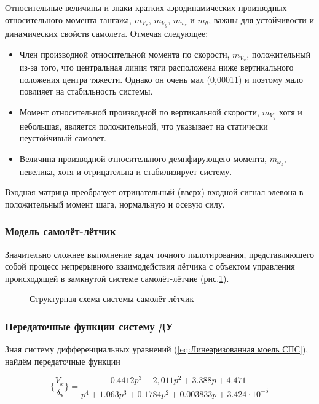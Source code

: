 Относительные величины и знаки кратких аэродинамических
производных относительного момента тангажа, $m_{V_x}$, $m_{V_y}$, $m_{\omega_z}$ и $m_\theta$, важны для устойчивости и динамических свойств
самолета. Отмечая следующее:
\begin{itemize}
\item Член производной относительной момента по скорости, $m_{V_x}$, положительный из-за того, что центральная линия тяги расположена
ниже вертикального положения центра тяжести. Однако он очень мал (0,00011) и поэтому мало повлияет на стабильность системы.
\item Момент относительной производной по вертикальной скорости, $m_{V_y}$ хотя и небольшая, является положительной, что указывает на статически
неустойчивый самолет.
\item Величина производной относительного демпфирующего момента, $m_{\omega_z}$, невелика, хотя и отрицательна и стабилизирует систему.
\end{itemize}

Входная матрица преобразует отрицательный (вверх) входной сигнал элевона в положительный момент шага, нормальную и осевую силу.

\subsubsection{Модель самолёт-лётчик}

Значительно сложнее выполнение задач точного пилотирования, представляющего собой процесс непрерывного взаимодействия лётчика
с объектом управления происходящей в замкнутой системе самолёт-лётчие (рис.{\ref{fig:Самолёт-лётчик}}).

\begin{figure}
    {\label{fig:Самолёт-лётчик}}
    \caption{Структурная схема системы самолёт-лётчик}   
\end{figure}



\subsubsection{Передаточные функции систему ДУ}

Зная систему дифференциальных уравнений ({\ref{eq:Линеаризованная моель СПС}}), найдём передаточные функции 

\begin{equation}
    \label{eq:ПФ по горизонтальной скорости СПС}
    \{ \frac{V_x}{\delta_\text{э}} \} = \frac{-0.4412p^3 - 2,011p^2 + 3.388p + 4.471}{p^4 + 1.063p^3 + 0.1784p^2 + 0.003833p + 3.424 \cdot 10^{-5}}
\end{equation}

